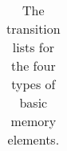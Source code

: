 \begin{enumerate}
\begin{table}[ht]
{\begin{tabular}{cccc}
                    \\
                \end{tabular}
            }
            \caption{The transition lists for the four types of basic memory elements.}
            \label{table:tl}
        \end{table}

\end{enumerate}

